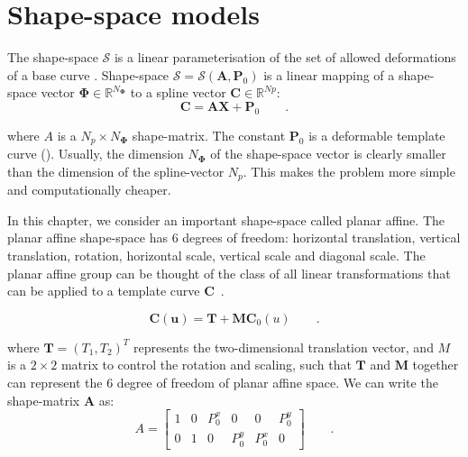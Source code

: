 \section{Shape-space models}
\label{sec:ssm}

The shape-space $\mathcal{S}$ is a linear parameterisation of the set of allowed
deformations of a base curve \cite{blake1998active}. Shape-space
$\mathcal{S} = \mathcal{S}(\mathbf{A},\mathbf{P}_0)$ is a linear mapping of a shape-space
vector $\mathbf{\Phi} \in  \mathbb{R}^{N_{\mathbf{\Phi}}}$ to a spline vector $\mathbf{C} \in
\mathbb{R}^{Np}$:
\begin{equation}
  \label{eq:4.16}
  \mathbf{C} = \mathbf{A}\mathbf{X}+ \mathbf{P}_0\qquad.
\end{equation}

where $A$ is a $N_p \times N_{\mathbf{\Phi}}$ shape-matrix. The
constant  $\mathbf{P}_0$ is a deformable template curve (\cite{blake1998active}). Usually, the
dimension $N_{\mathbf{\Phi}}$ of the shape-space vector is clearly
smaller than the dimension of the spline-vector $N_p$. This makes the
problem more simple and computationally cheaper.

In this chapter, we consider an important shape-space called planar
affine. The planar affine shape-space has 6 degrees of freedom: horizontal
translation, vertical translation, rotation, horizontal scale,
vertical scale and diagonal scale. The planar affine group can be
thought of the class of all linear transformations that can be applied
to a template curve $\mathbf{C}$~\cite{blake1998active}. 

\begin{equation}
  \label{eq:4.17}
  \mathbf{C(u)} = \mathbf{T} + \mathbf{M} \mathbf{C}_0(u)\qquad.
\end{equation}

where $\mathbf{T} = (T_1, T_2)^T$ represents the two-dimensional translation
vector, and $M$ is a $2 \times 2$ matrix to control the rotation and
scaling, such that $\mathbf{T}$ and $\mathbf{M}$ together can represent the 6 degree of
freedom of planar affine space. We can write the shape-matrix $\mathbf{A}$
as:
\begin{equation}
  \label{eq:4.18}
  A =
  \begin{bmatrix}
    1 & 0 & P_0^x & 0 & 0 & P_0^y\\
    0 & 1 & 0 & P_0^y & P_0^x & 0
  \end{bmatrix}\qquad. 
\end{equation}

